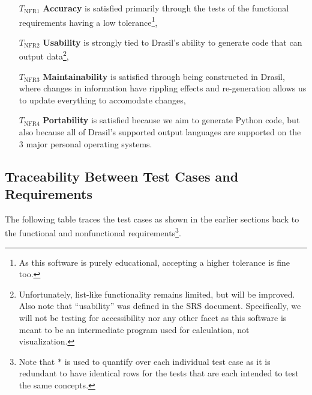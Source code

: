 \documentclass[12pt, titlepage]{article}
\begin{document}
\begin{enumerate}

    \item[$T_\text{NFR1}$] \textbf{Accuracy} is satisfied primarily through the
                tests of the functional requirements having a low
                tolerance\footnote{As this software is purely educational,
                accepting a higher tolerance is fine too.},

    \item[$T_\text{NFR2}$] \textbf{Usability} is strongly tied to Drasil's
                ability to generate code that can output
                data\footnote{Unfortunately, list-like functionality remains
                limited, but will be improved. Also note that ``usability'' was
                defined in the SRS document. Specifically, we will not be
                testing for accessibility nor any other facet as this software
                is meant to be an intermediate program used for calculation, not
                visualization.},

    \item[$T_\text{NFR3}$] \textbf{Maintainability} is satisfied through being
                constructed in Drasil, where changes in information have
                rippling effects and re-generation allows us to update
                everything to accomodate changes,

    \item[$T_\text{NFR4}$] \textbf{Portability} is satisfied because we aim to
                generate Python code, but also because all of Drasil's supported
                output languages are supported on the 3 major personal operating
                systems.

\end{enumerate}

\subsection{Traceability Between Test Cases and Requirements}

The following table traces the test cases as shown in the earlier sections back
to the functional and nonfunctional requirements\footnote{Note that $*$ is used
to quantify over each individual test case as it is redundant to have identical
rows for the tests that are each intended to test the same concepts.}.
\end{document}
